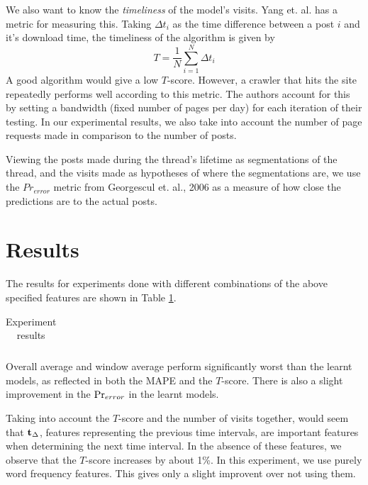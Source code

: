 \documentclass[12 pt]{article}
\begin{document}
We also want to know the \emph{timeliness} of the model's visits. Yang et. al. \cite{Yang2009} has a metric for measuring this. Taking $\Delta t_i$ as the time difference between a post $i$ and it's download time, the timeliness of the algorithm is given by
\[T = \frac{1}{N} \sum^{N}_{i=1}\Delta t_i\]
A good algorithm would give a low $T$-score. However, a crawler that hits the site repeatedly performs well according to this metric. The authors account for this by setting a bandwidth (fixed number of pages per day) for each iteration of their testing. In our experimental results, we also take into account the number of page requests made in comparison to the number of posts. %

Viewing the posts made during the thread's lifetime as segmentations of the thread, and the visits made as hypotheses of where the segmentations are, we use the $Pr_{error}$ metric from Georgescul et. al., 2006 as a measure of how close the predictions are to the actual posts.



\section{Results}

The results for experiments done with different combinations of the above specified features are shown in Table \ref{expt1}.
\begin{table}
	\footnotesize
	\begin{centering}
	\begin{tabular}{|l|c|c|c|c|c|c|c|c|}
	\hline
	
	\hline
	\end{tabular}
	\caption{Experiment results}
	\label{expt1}
\end{centering}
\end{table}

Overall average and window average perform significantly worst than the learnt models, as reflected in both the MAPE and the $T$-score. There is also a slight improvement in the  $\Pr_{error}$ in the learnt models.


Taking into account the $T$-score and the number of visits together, would seem that $\mathbf{t}_\Delta$, features representing the previous time intervals, are important features when determining the next time interval. In the absence of these features, we observe that the $T$-score increases by about 1\%. In this experiment, we use purely word frequency features. This gives only a slight improvent over not using them.
\end{document}
